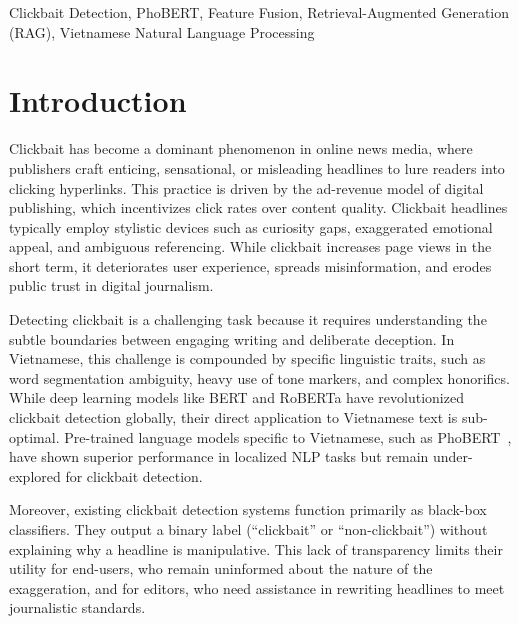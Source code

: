 \documentclass[conference]{IEEEtran}
\begin{document}
\begin{IEEEkeywords}
Clickbait Detection, PhoBERT, Feature Fusion, Retrieval-Augmented Generation (RAG), Vietnamese Natural Language Processing
\end{IEEEkeywords}

\section{Introduction}
Clickbait has become a dominant phenomenon in online news media, where publishers craft enticing, sensational, or misleading headlines to lure readers into clicking hyperlinks. This practice is driven by the ad-revenue model of digital publishing, which incentivizes click rates over content quality. Clickbait headlines typically employ stylistic devices such as curiosity gaps, exaggerated emotional appeal, and ambiguous referencing. While clickbait increases page views in the short term, it deteriorates user experience, spreads misinformation, and erodes public trust in digital journalism.

Detecting clickbait is a challenging task because it requires understanding the subtle boundaries between engaging writing and deliberate deception. In Vietnamese, this challenge is compounded by specific linguistic traits, such as word segmentation ambiguity, heavy use of tone markers, and complex honorifics. While deep learning models like BERT and RoBERTa have revolutionized clickbait detection globally, their direct application to Vietnamese text is sub-optimal. Pre-trained language models specific to Vietnamese, such as PhoBERT~\cite{nguyen2020phobert}, have shown superior performance in localized NLP tasks but remain under-explored for clickbait detection.

Moreover, existing clickbait detection systems function primarily as black-box classifiers. They output a binary label (``clickbait'' or ``non-clickbait'') without explaining why a headline is manipulative. This lack of transparency limits their utility for end-users, who remain uninformed about the nature of the exaggeration, and for editors, who need assistance in rewriting headlines to meet journalistic standards.
\end{document}
